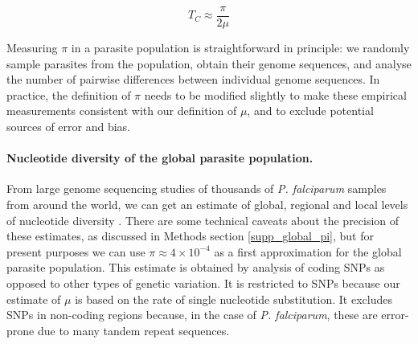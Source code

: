 \documentclass[_main.tex]{subfiles}
\begin{document}
\begin{equation}
T_C \approx \frac{\pi}{2 \mu}
\label{eq:main_Tc_pi}
\end{equation}

Measuring $\pi$ in a parasite population is straightforward in principle: we randomly sample parasites from the population, obtain their genome sequences, and analyse the number of pairwise differences between individual genome sequences. In practice, the definition of $\pi$ needs to be modified slightly to make these empirical measurements consistent with our definition of $\mu$, and to exclude potential sources of error and bias.


\paragraph{Nucleotide diversity of the global parasite population.} 
\label{main_global_diversity_1}

From large genome sequencing studies of thousands of \textit{P. falciparum} samples from around the world, we can get an estimate of global, regional and local levels of nucleotide diversity  \cite{MalariaGEN2021,MalariaGEN2023}.  There are some technical caveats about the precision of these estimates, as discussed in Methods section \ref{supp_global_pi}, but for present purposes we can use $\pi \approx 4 \times 10^{-4}$ as a first approximation for the global parasite population.  This estimate is obtained by analysis of coding SNPs as opposed to other types of genetic variation.  It is restricted to SNPs because our estimate of $\mu$ is based on the rate of single nucleotide substitution.  It excludes SNPs in non-coding regions because, in the case of \textit{P. falciparum}, these are error-prone due to many tandem repeat sequences.  




\end{document}

